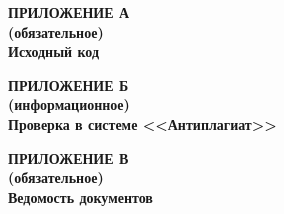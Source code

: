\begin{center}
\textbf{
\MakeUppercase{Приложение А}\\
(обязательное)\\
Исходный код}
\end{center}



\newpage

\begin{center}
\textbf{
\MakeUppercase{Приложение Б}\\
(информационное)\\
Проверка в системе <<Антиплагиат>>}
\end{center}

\newpage
\pagestyle{empty}

\pagestyle{fancy}

\newpage


\begin{center}
\textbf{
\MakeUppercase{Приложение В}\\
(обязательное)\\
Ведомость документов}
\end{center}

\newpage
\pagestyle{empty}

\pagestyle{fancy}